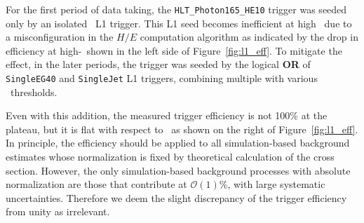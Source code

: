 For the first period of data taking, the \texttt{HLT\_Photon165\_HE10} trigger was seeded only by an isolated \egamma\ L1 trigger. 
This L1 seed becomes inefficient at high \ET\ due to a misconfiguration in the $H/E$ computation algorithm as indicated by the drop in efficiency at high-\ET\ shown in the left side of Figure~\ref{fig:l1_eff}. 
To mitigate the effect, in the later periods, the trigger was seeded by the logical \textbf{OR} of \texttt{SingleEG40} and \texttt{SingleJet} L1 triggers, combining multiple with various \pt\ thresholds. 

Even with this addition, the measured trigger efficiency is not 100\% at the plateau, but it is flat with respect to \ET\ as shown on the right of Figure~\ref{fig:l1_eff}. 
In principle, the efficiency should be applied to all simulation-based background estimates whose normalization is fixed by theoretical calculation of the cross section.
However, the only simulation-based background processes with absolute normalization are those that contribute at $\mathcal{O}(1)$\%, with large systematic uncertainties. 
Therefore we deem the slight discrepancy of the trigger efficiency from unity as irrelevant.

